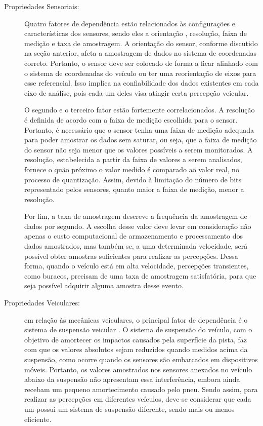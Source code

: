 \begin{description}
	
	\item [Propriedades Sensoriais:] 
	
	Quatro fatores de dependência estão relacionados às configurações e características dos sensores, sendo eles a orientação \cite{Kumar2017}, resolução, faixa de medição e taxa de amostragem. A orientação do sensor, conforme discutido na seção anterior, afeta a amostragem de dados no sistema de coordenadas correto. Portanto, o sensor deve ser colocado de forma a ficar alinhado com o sistema de coordenadas do veículo ou ter uma reorientação de eixos para esse referencial. Isso implica na confiabilidade dos dados existentes em cada eixo de análise, pois cada um deles visa atingir certa percepção veicular.

	O segundo e o terceiro fator estão fortemente correlacionados. A resolução é definida de acordo com a faixa de medição escolhida para o sensor. Portanto, é necessário que o sensor tenha uma faixa de medição adequada para poder amostrar os dados sem saturar, ou seja, que a faixa de medição do sensor não seja menor que os valores possíveis a serem monitorados. A resolução, estabelecida a partir da faixa de valores a serem analisados, fornece o quão próximo o valor medido é comparado ao valor real, no processo de quantização. Assim, devido à limitação do número de bits representado pelos sensores, quanto maior a faixa de medição, menor a resolução.
	
	Por fim, a taxa de amostragem descreve a frequência da amostragem de dados por segundo. A escolha desse valor deve levar em consideração não apenas o custo computacional de armazenamento e processamento dos dados amostrados, mas também se, a uma determinada velocidade, será possível obter amostras suficientes para realizar as percepções. Dessa forma, quando o veículo está em alta velocidade, percepções transientes, como buracos, precisam de uma taxa de amostragem satisfatória, para que seja possível adquirir alguma amostra desse evento.
	
	\item [Propriedades Veiculares:] em relação às mecânicas veiculares, o principal fator de dependência é o sistema de suspensão veicular \cite{Kumar2017, Wickramarathne2018}. O sistema de suspensão do veículo, com o objetivo de amortecer os impactos causados pela superfície da pista, faz com que os valores absolutos sejam reduzidos quando medidos acima da suspensão, como ocorre quando os sensores são embarcados em dispositivos móveis. Portanto, os valores amostrados nos sensores anexados no veículo abaixo da suspensão não apresentam essa interferência, embora ainda recebam um pequeno amortecimento causado pelo pneu. Sendo assim, para realizar as percepções em diferentes veículos, deve-se considerar que cada um possui um sistema de suspensão diferente, sendo mais ou menos eficiente.


\end{description}
